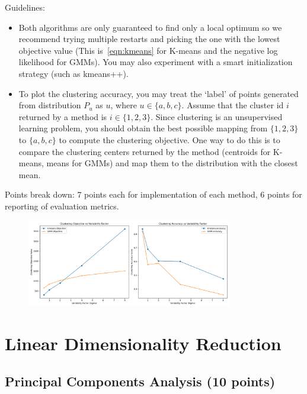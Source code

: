 \documentclass[a4paper]{article}
\newcounter{thm}
\theoremstyle{definition}
\newenvironment{soln}{
    \leavevmode\color{blue}\ignorespaces
}{}
\begin{document}
Guidelines:
\begin{itemize} 
\item Both algorithms are only guaranteed to find only a local optimum so we recommend trying multiple
restarts and picking the one with the lowest objective value (This is~\eqref{eqn:kmeans} for K-means and the negative log likelihood for GMMs).
You may also experiment with a smart initialization
strategy (such as kmeans++).

\item
To plot the clustering accuracy,  you may treat the `label' of points generated from distribution
$P_u$ as $u$, where $u\in \{a, b, c\}$.
Assume that the cluster id $i$ returned by a method is $i\in \{1, 2, 3\}$.
Since clustering is an unsupervised learning problem, you should obtain the best possible mapping
from $\{1, 2, 3\}$ to $\{a, b, c\}$ to compute the clustering objective.
One way to do this is to compare the clustering centers returned by the method (centroids for
K-means, means for GMMs) and map them to the distribution with the closest mean.

\end{itemize}

Points break down: 7 points each for implementation of each method, 6 points for reporting of
evaluation metrics.

\begin{soln}
    \begin{figure}[h!]
        \centering
        \includegraphics[width=0.8\textwidth]{1.2.png}  
    \end{figure}
\end{soln}



\section{Linear Dimensionality Reduction}

\subsection{Principal Components Analysis  (10 points)}
\label{sec:pca}
\end{document}
